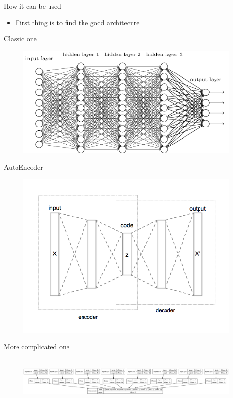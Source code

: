 \documentclass[10pt,
			   xcolor=svgnames,
			   hyperref={linkcolor=red, citecolor = DarkGreen, colorlinks=true, urlcolor=Navy}] {beamer}
\newcommand{\warrow}{\item[\color{blue!50!black!70} \tiny{\ding{109}}]}
\begin{document}
\begin{frame}{How it can be used}
	\begin{itemize}
		\warrow First thing is to find the good architecure
	\end{itemize}
	\vspace{-3mm}
	\begin{multicols}{2}
	Classic one
	\vspace{-8mm}	
		\begin{figure}[!ht]
			\centering
			\includegraphics[scale=0.3]{1bCQl.png}
		\end{figure}

	\columnbreak
	AutoEncoder
	\vspace{-8mm}	
		\begin{figure}[!ht]
			\centering
			\includegraphics[scale=0.23]{Autoencoder_structure.png}
	\end{figure}	
	
	\end{multicols}
		\vspace{-9mm}	
	More complicated one 
	\vspace{-5mm}	
	\begin{figure}[!ht]
		\centering
		\includegraphics[width=11.2cm, height=2.5cm]{model_plot.png}
	\end{figure}
	
\end{frame}
\end{document}
